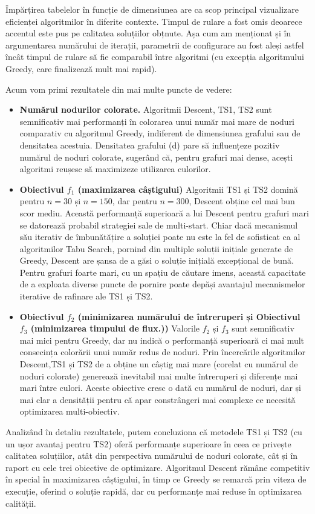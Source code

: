 Împărțirea tabelelor în funcție de dimensiunea are ca scop principal vizualizare eficienței algoritmilor în diferite contexte. Timpul de rulare a fost omis deoarece accentul este pus pe calitatea soluțiilor obțnute. Așa cum am menționat și în argumentarea numărului de iterații, parametrii de configurare au fost aleși astfel încât timpul de rulare să fie comparabil între algoritmi (cu excepția algoritmului Greedy, care finalizează mult mai rapid).

Acum vom primi rezultatele din mai multe puncte de vedere:
\begin{itemize}
  \item  {\bf Numărul nodurilor colorate.} Algoritmii Descent, TS1, TS2 sunt semnificativ mai performanți în colorarea unui număr mai mare de noduri comparativ cu algoritmul Greedy, indiferent de dimensiunea grafului sau de densitatea acestuia. Densitatea grafului (d) pare să influențeze pozitiv numărul de noduri colorate, sugerând că, pentru grafuri mai dense, acești algoritmi reușesc să maximizeze utilizarea culorilor.
  
  \item {\bf Obiectivul $f_1$ (maximizarea câștigului)} Algoritmii TS1 și TS2 domină pentru $n=30$ și $n=150$, dar pentru $n=300$, Descent obține cel mai bun scor mediu. Această performanță superioară a lui Descent pentru grafuri mari se datorează probabil strategiei sale de multi-start. Chiar dacă mecanismul său iterativ de îmbunătățire a soluției poate nu este la fel de sofisticat ca al algoritmilor Tabu Search, pornind din multiple soluții inițiale generate de Greedy, Descent are șansa de a găsi o soluție inițială excepțional de bună. Pentru grafuri foarte mari, cu un spațiu de căutare imens, această capacitate de a exploata diverse puncte de pornire poate depăși avantajul mecanismelor iterative de rafinare ale TS1 și TS2.

  \item {\bf Obiectivul $f_2$ (minimizarea numărului de 
  întreruperi și Obiectivul $f_3$ (minimizarea timpului de flux.))} Valorile $f_2$ și $f_3$ sunt semnificativ mai mici pentru Greedy, dar nu indică o performanță superioară ci mai mult consecința colorării unui număr redus de noduri. Prin încercările algoritmilor Descent,TS1 și TS2 de a obține un câștig mai mare (corelat cu numărul de noduri colorate) generează inevitabil mai multe întreruperi și diferențe mai mari între culori. Aceste obiective cresc o dată cu numărul de noduri, dar și mai clar a densității pentru că apar constrângeri mai complexe ce necesită optimizarea multi-obiectiv.

\end{itemize}

Analizând în detaliu rezultatele, putem concluziona că metodele TS1 și TS2 (cu un ușor avantaj pentru TS2) oferă performanțe superioare în ceea ce privește calitatea soluțiilor, atât din perspectiva numărului de noduri colorate, cât și în raport cu cele trei obiective de optimizare. Algoritmul Descent rămâne competitiv în special în maximizarea câștigului, în timp ce Greedy se remarcă prin viteza de execuție, oferind o soluție rapidă, dar cu performanțe mai reduse în optimizarea calității.





